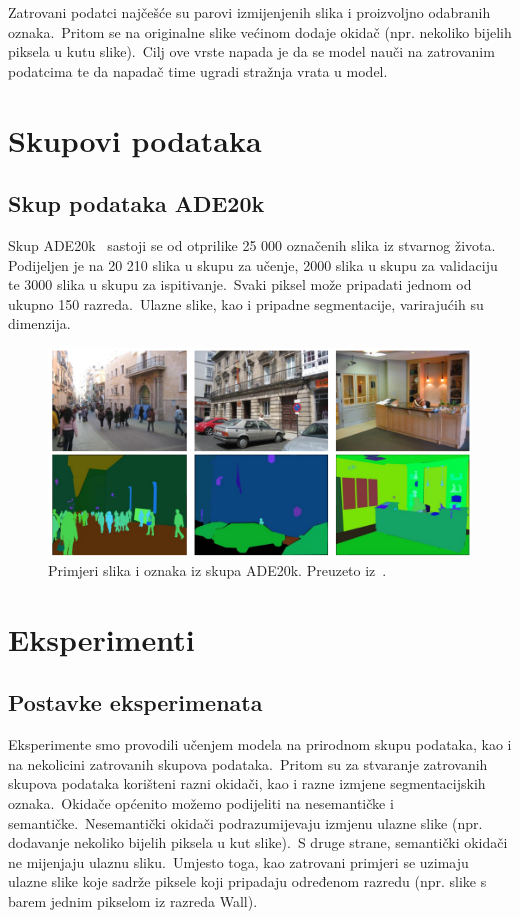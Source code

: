 \documentclass[times, utf8, seminar, numeric]{fer}
\begin{document}
Zatrovani podatci najčešće su parovi izmijenjenih slika i proizvoljno odabranih oznaka.\ Pritom se na originalne slike većinom dodaje okidač (npr. nekoliko bijelih piksela u kutu slike).\ Cilj ove vrste napada je da se model nauči na zatrovanim podatcima te da napadač time ugradi stražnja vrata u model.

\chapter{Skupovi podataka}

\section{Skup podataka ADE20k}

Skup ADE20k~\cite{zhou2019semantic} sastoji se od otprilike 25 000 označenih slika iz stvarnog života. Podijeljen je na 20 210 slika u skupu za učenje, 2000 slika u skupu za validaciju te 3000 slika u skupu za ispitivanje.\ 
Svaki piksel može pripadati jednom od ukupno 150 razreda.\ Ulazne slike, kao i pripadne segmentacije, varirajućih su dimenzija.
  
\begin{figure}[htb]
    \centering
    \includegraphics[scale=1]{./Slike/ade20k.png}
    \caption{Primjeri slika i oznaka iz skupa ADE20k. Preuzeto iz~\cite{zhou2019semantic}.}
    \label{fig:ade20k}
\end{figure}
\chapter{Eksperimenti}

\section{Postavke eksperimenata}

Eksperimente smo provodili učenjem modela na prirodnom skupu podataka, kao i na nekolicini zatrovanih skupova podataka.\ Pritom su za stvaranje zatrovanih skupova podataka korišteni razni okidači, kao i razne izmjene segmentacijskih oznaka.\ 
Okidače općenito možemo podijeliti na nesemantičke i semantičke.\ Nesemantički okidači podrazumijevaju izmjenu ulazne slike (npr. dodavanje nekoliko bijelih piksela u kut slike).\ S druge strane, semantički okidači ne mijenjaju ulaznu sliku.\ 
Umjesto toga, kao zatrovani primjeri se uzimaju ulazne slike koje sadrže piksele koji pripadaju određenom razredu (npr. slike s barem jednim pikselom iz razreda Wall).
  
\end{document}
